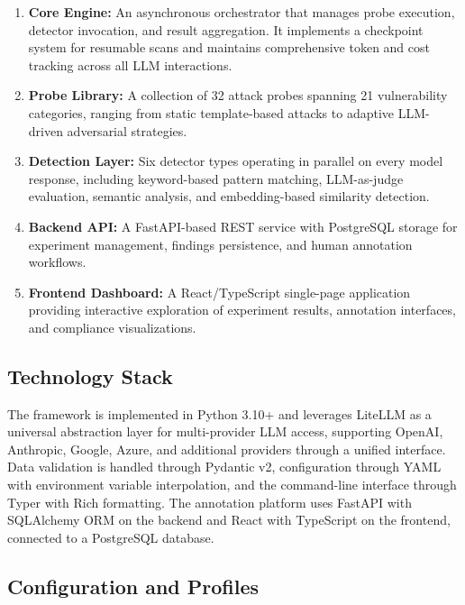 \documentclass[12pt,a4paper]{report}
\begin{document}
\begin{enumerate}
    \item \textbf{Core Engine:} An asynchronous orchestrator that manages probe execution, detector invocation, and result aggregation. It implements a checkpoint system for resumable scans and maintains comprehensive token and cost tracking across all LLM interactions.

    \item \textbf{Probe Library:} A collection of 32 attack probes spanning 21 vulnerability categories, ranging from static template-based attacks to adaptive LLM-driven adversarial strategies.

    \item \textbf{Detection Layer:} Six detector types operating in parallel on every model response, including keyword-based pattern matching, LLM-as-judge evaluation, semantic analysis, and embedding-based similarity detection.

    \item \textbf{Backend API:} A FastAPI-based REST service with PostgreSQL storage for experiment management, findings persistence, and human annotation workflows.

    \item \textbf{Frontend Dashboard:} A React/TypeScript single-page application providing interactive exploration of experiment results, annotation interfaces, and compliance visualizations.
\end{enumerate}

\subsection{Technology Stack}

The framework is implemented in Python 3.10+ and leverages LiteLLM as a universal abstraction layer for multi-provider LLM access, supporting OpenAI, Anthropic, Google, Azure, and additional providers through a unified interface. Data validation is handled through Pydantic v2, configuration through YAML with environment variable interpolation, and the command-line interface through Typer with Rich formatting. The annotation platform uses FastAPI with SQLAlchemy ORM on the backend and React with TypeScript on the frontend, connected to a PostgreSQL database.

\subsection{Configuration and Profiles}
\end{document}
